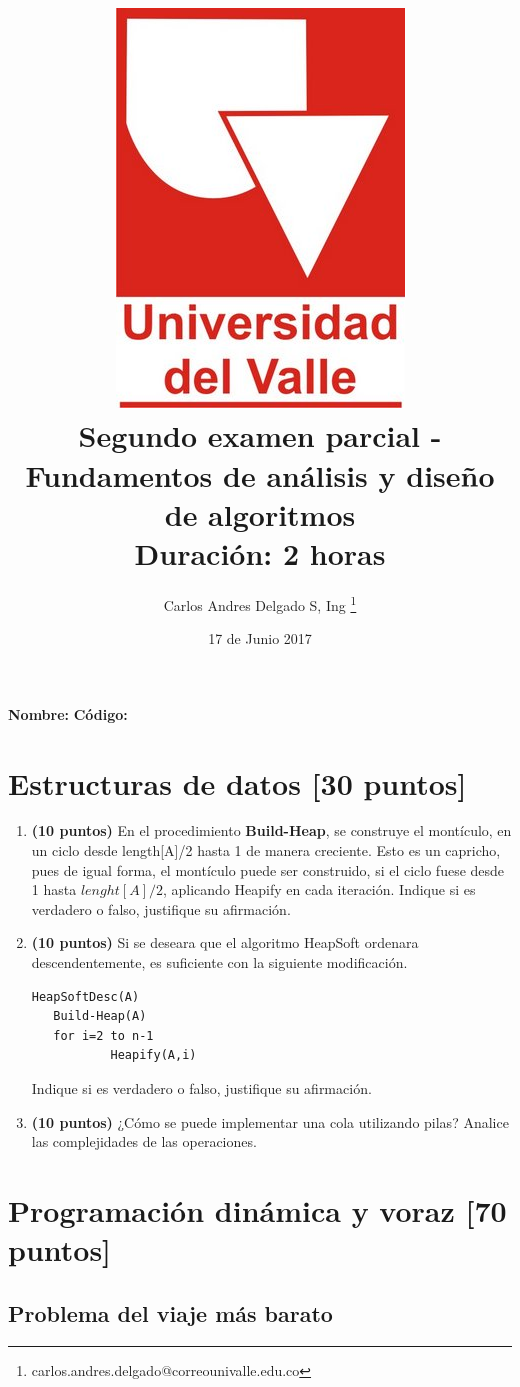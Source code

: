 \documentclass[10pt,twocolumn]{article}
\title{\vspace{-2cm} \includegraphics[scale=0.15]{univalle.jpg} \\Segundo examen parcial - Fundamentos de análisis y diseño de algoritmos \\ Duración: 2 horas \vspace{-0.5cm}}
\author{Carlos Andres Delgado S, Ing \footnote{ carlos.andres.delgado@correounivalle.edu.co }}
\date{\vspace{-0.2cm}17 de Junio 2017}
\newcommand{\raya}{\underline{\hspace{3cm}}}
\begin{document}
\maketitle
\vspace{-0.2cm}
{\bf Nombre:\underline{\hspace{6cm}}}
\hfill
{\bf Código:\raya}


\section{Estructuras de datos \small{[30 puntos]}} 

\begin{enumerate}
	\item \textbf{(10 puntos)} En el procedimiento \textbf{Build-Heap}, se construye el montículo, en un ciclo desde length[A]/2 hasta 1 de manera creciente. Esto es un capricho, pues de igual forma, el montículo puede ser construido, si el ciclo fuese desde 1 hasta $lenght[A]/2$, aplicando Heapify en cada iteración. Indique si es verdadero o falso, justifique su afirmación. 
	\item \textbf{(10 puntos)} Si se deseara que el algoritmo HeapSoft ordenara descendentemente, es suficiente con la siguiente modificación.
\begin{lstlisting}
HeapSoftDesc(A)
   Build-Heap(A)
   for i=2 to n-1
           Heapify(A,i)
\end{lstlisting}
Indique si es verdadero o falso, justifique su afirmación. 
	\item \textbf{(10 puntos)} ¿Cómo se puede implementar una cola utilizando pilas? Analice las complejidades de las operaciones.
\end{enumerate}




\section{Programación dinámica y voraz \small{[70 puntos]}} 

\subsection{Problema del viaje más barato}
\end{document}
